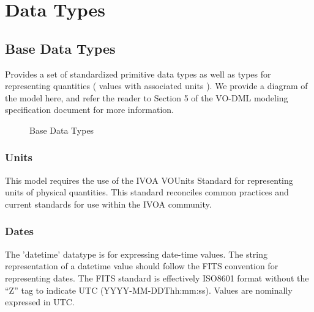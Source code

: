 \pagebreak
\section{Data Types}

  \subsection{Base Data Types}
  \label{sect:ivoa}
  Provides a set of standardized primitive data types as well as types for representing quantities
( values with associated units ). We provide a diagram of the model here, and refer the reader to
Section 5 of the VO-DML modeling specification document \citep{2018ivoa.spec.0910L} for more information.


    \begin{figure}[h]
    \begin{center}
      \caption{Base Data Types}\label{fig:basetypes}
    \end{center}
    \end{figure}

  \subsubsection{Units}
  \label{sect:Units}
  This model requires the use of the IVOA VOUnits Standard \citep{2014ivoa.spec.0523D} for representing units of physical
quantities. This standard reconciles common practices and current standards for use within the
IVOA community.

  \subsubsection{Dates}
  \label{sect:Dates}
  The 'datetime' datatype is for expressing date-time values. The string representation of a
datetime value should follow the FITS convention for representing dates. The FITS standard is
effectively ISO8601 format without the ``Z'' tag to indicate UTC (YYYY-MM-DDThh:mm:ss).
Values are nominally expressed in UTC.
